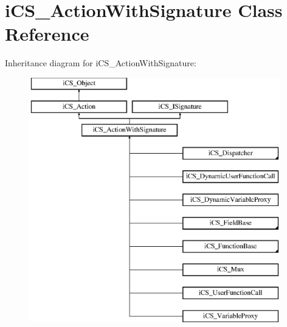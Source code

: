 \hypertarget{classi_c_s___action_with_signature}{\section{i\+C\+S\+\_\+\+Action\+With\+Signature Class Reference}
\label{classi_c_s___action_with_signature}
}
Inheritance diagram for i\+C\+S\+\_\+\+Action\+With\+Signature\+:\begin{figure}[H]
\begin{center}
\leavevmode
\includegraphics[height=10.639032cm]{classi_c_s___action_with_signature}
\end{center}
\end{figure}
